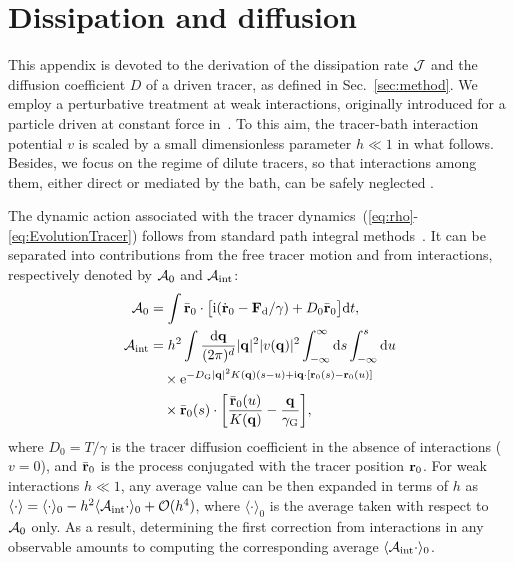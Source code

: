 \documentclass[pre, superscriptaddress, twocolumn,pre]{revtex4-1}
\begin{document}


\appendix

\section{Dissipation and diffusion}\label{app:diff}

This appendix is devoted to the derivation of the dissipation rate $\cal J$ and the diffusion coefficient $D$ of a driven tracer, as defined in Sec.~\ref{sec:method}. We employ a perturbative treatment at weak interactions, originally introduced for a particle driven at constant force in~\cite{Demery2011, Demery2014}. To this aim, the tracer-bath interaction potential $v$ is scaled by a small dimensionless parameter $h\ll1$ in what follows. Besides, we focus on the regime of dilute tracers, so that interactions among them, either direct or mediated by the bath, can be safely neglected .


The dynamic action associated with the tracer dynamics~(\ref{eq:rho}-\ref{eq:EvolutionTracer}) follows from standard path integral methods~\cite{Martin1973, Dominicis1975}. It can be separated into contributions from the free tracer motion and from interactions, respectively denoted by ${\cal A}_0$ and ${\cal A}_{\rm int}$:
\begin{equation}\label{eq:action}
	\begin{aligned}
		{\cal A}_0 &= \int \bar{\bf r}_0 \cdot \big[ {\rm i}(\dot{\bf r}_0 - {\bf F}_{\rm d}/\gamma) + D_0 \bar{\bf r}_0 \big] {\rm d}t ,
		\\
		{\cal A}_{\rm int} &= h^2 \int \frac{{\rm d}{\bf q}}{(2\pi)^d} |{\bf q}|^2 |v({\bf q})|^2 \int_{-\infty}^\infty {\rm d}s\int_{-\infty}^s{\rm d}u
		\\
		&\quad\times {\rm e}^{-D_{\rm G}|{\bf q}|^2K({\bf q})(s-u)+{\rm i}{\bf q}\cdot[{\bf r}_0(s)-{\bf r}_0(u)]}
		\\
		&\quad\times \bar{\bf r}_0(s) \cdot \bigg[ \frac{\bar{\bf r}_0(u)}{K({\bf q})} - \frac{{\bf q}}{\gamma_{\rm G}} \bigg] ,
	\end{aligned}
\end{equation}
where $D_0=T/\gamma$ is the tracer diffusion coefficient in the absence of interactions ($v=0$), and $\bar{\bf r}_0$ is the process conjugated with the tracer position ${\bf r}_0$. For weak interactions $h\ll1$, any average value can be then expanded in terms of $h$ as $\langle\cdot\rangle=\langle\cdot\rangle_0 - h^2 \langle{\cal A}_{\rm int}\cdot\rangle_0 + {\cal O}(h^4)$, where $\langle\cdot\rangle_0$ is the average taken with respect to ${\cal A}_0$ only. As a result, determining the first correction from interactions in any observable amounts to computing the corresponding average $\langle{\cal A}_{\rm int}\cdot\rangle_0$.
\end{document}
